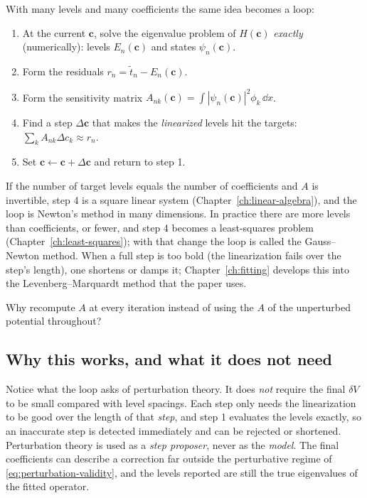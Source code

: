 With many levels and many coefficients the same idea becomes a loop:
\begin{enumerate}
\item At the current $\bm c$, solve the eigenvalue problem of $H(\bm c)$ \emph{exactly} (numerically): levels $E_n(\bm c)$ and states $\psi_n(\bm c)$.
\item Form the residuals $r_n=\tilde t_n-E_n(\bm c)$.
\item Form the sensitivity matrix $A_{nk}(\bm c)=\int|\psi_n(\bm c)|^2\phi_k\,\dd x$.
\item Find a step $\Delta\bm c$ that makes the \emph{linearized} levels hit the targets: $\sum_kA_{nk}\Delta c_k\approx r_n$.
\item Set $\bm c\leftarrow\bm c+\Delta\bm c$ and return to step 1.
\end{enumerate}
If the number of target levels equals the number of coefficients and $A$ is invertible, step 4 is a square linear system (Chapter~\ref{ch:linear-algebra}), and the loop is Newton's method in many dimensions. In practice there are more levels than coefficients, or fewer, and step 4 becomes a least-squares problem (Chapter~\ref{ch:least-squares}); with that change the loop is called the Gauss--Newton method. When a full step is too bold (the linearization fails over the step's length), one shortens or damps it; Chapter~\ref{ch:fitting} develops this into the Levenberg--Marquardt method that the paper uses.

\begin{checkpoint}
Why recompute $A$ at every iteration instead of using the $A$ of the unperturbed potential throughout?
\end{checkpoint}

\subsection{Why this works, and what it does not need}

Notice what the loop asks of perturbation theory. It does \emph{not} require the final $\delta V$ to be small compared with level spacings. Each step only needs the linearization to be good over the length of that \emph{step}, and step 1 evaluates the levels exactly, so an inaccurate step is detected immediately and can be rejected or shortened. Perturbation theory is used as a \emph{step proposer}, never as the \emph{model}. The final coefficients can describe a correction far outside the perturbative regime of \cref{eq:perturbation-validity}, and the levels reported are still the true eigenvalues of the fitted operator.

